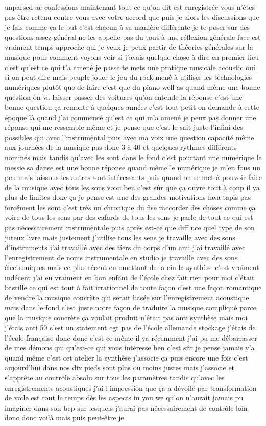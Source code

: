 unparsed 
ac confessions maintenant tout ce qu'on dit est enregistrée vous n'êtes pas être retenu contre vous avec votre accord que puis-je alors les discussions que je fais comme ça le but c'est chacun à sa manière différente je te poser sur des questions assez général ne les appelle pas du tout à une réflexion générale face est vraiment temps approche qui je veux je peux partir de théories générales sur la musique pour comment voyons voir si j'avais quelque chose à dire en premier lieu c'est qu'est ce qui t'a amené je passe te mets une pratique musicale acoustic oui si on peut dire mais peuple jouer le jeu du rock mené à utiliser les technologies numériques plutôt que de faire c'est que du piano well as quand même une bonne question on va laisser passer des voitures qu'on entende la réponse c'est une bonne question ça remonte à quelques années c'est tout petit on demande à cette époque là quand j'ai commencé qu'est ce qui m'a amené je peux pas donner une réponse qui me ressemble même et je pense que c'est le sait juste l'infini des possibles qui avec l'instrumental puis avec ma voix une question capacité même aux journées de la musique pas donc 3 à 40 et quelques rythmes différents nominés mais tandis qu'avec les sont dans le fond c'est pourtant une numérique le messie sa danse est une bonne réponse quand même le numérique je m'en fous un peu mais laissons les autres sont intéressants puis quand on se met à pouvoir faire de la musique avec tous les sons voici ben c'est sûr que ça ouvre tout à coup il ya plus de limites donc ça je pense est une des grandes motivations fava tapis pas forcément les sont c'est très un chronique du fise raccorder des choses comme ça voire de tous les sens par des cafards de tous les sens je parle de tout ce qui est pas nécessairement instrumentale puis après est-ce que diff nce quel type de son juteux livre mais justement j'utilise tous les sens je travaille avec des sons d'instruments j'ai travaillé avec des tiers du corps d'un ami j'ai travaillé avec l'enregistrement de noms instrumentale en studio je travaille avec des sons électroniques mais ce plus récent en omettant de la cin la synthèse c'est vraiment indécent j'ai eu vraiment en bon enfant de l'école chez fait rien pour moi c'était bastille ce qui est tout à fait irrationnel de toute façon c'est une façon romantique de vendre la musique concrète qui serait basée sur l'enregistrement acoustique mais dans le fond c'est juste notre façon de traduire la musique compliqué parce que la musique concrète ça voulait produit n'était pas anti synthèse mais moi j'étais anti 50 c'est un statement cgt pas de l'école allemande stockage j'étais de l'école française donc donc c'est ce même il ya récemment j'ai pu me débarrasser de mes démons qui qu'est-ce qui vous intéresse ben c'est sûr je pense jamais y'a quand même c'est cet atelier la synthèse j'associe ça puis encore une fois c'est aujourd'hui dans nos dix pieds sont plus ou moins justes mais j'associe et s'apprête au contrôle absolu sur tous les paramètres tandis qu'avec les enregistrements acoustiques j'ai l'impression que ça a dévoilé par transformation de voile est tout le temps dès les aspects in you we qu'on n'aurait jamais pu imaginer dans son bep sur lesquels j'aurai pas nécessairement de contrôle loin donc donc voilà mais puis peut-être je 